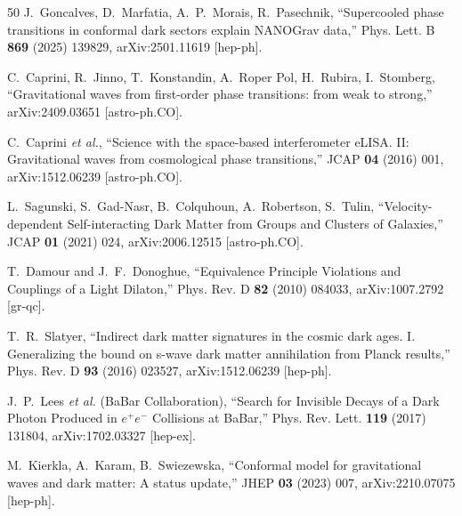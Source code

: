 \documentclass[12pt,a4paper]{article}
\begin{document}
\begin{thebibliography}{50}
J.~Goncalves, D.~Marfatia, A.~P.~Morais, R.~Pasechnik,
``Supercooled phase transitions in conformal dark sectors explain NANOGrav data,''
Phys. Lett. B \textbf{869} (2025) 139829, arXiv:2501.11619 [hep-ph].

C.~Caprini, R.~Jinno, T.~Konstandin, A.~Roper Pol, H.~Rubira, I.~Stomberg,
``Gravitational waves from first-order phase transitions: from weak to strong,''
arXiv:2409.03651 [astro-ph.CO].

C.~Caprini \textit{et al.},
``Science with the space-based interferometer eLISA. II: Gravitational waves from cosmological phase transitions,''
JCAP \textbf{04} (2016) 001, arXiv:1512.06239 [astro-ph.CO].

L.~Sagunski, S.~Gad-Nasr, B.~Colquhoun, A.~Robertson, S.~Tulin,
``Velocity-dependent Self-interacting Dark Matter from Groups and Clusters of Galaxies,''
JCAP \textbf{01} (2021) 024, arXiv:2006.12515 [astro-ph.CO].

T.~Damour and J.~F.~Donoghue,
``Equivalence Principle Violations and Couplings of a Light Dilaton,''
Phys. Rev. D \textbf{82} (2010) 084033, arXiv:1007.2792 [gr-qc].

T.~R.~Slatyer,
``Indirect dark matter signatures in the cosmic dark ages. I. Generalizing the bound on s-wave dark matter annihilation from Planck results,''
Phys. Rev. D \textbf{93} (2016) 023527, arXiv:1512.06239 [hep-ph].

J.~P.~Lees \textit{et al.} (BaBar Collaboration),
``Search for Invisible Decays of a Dark Photon Produced in $e^+e^-$ Collisions at BaBar,''
Phys. Rev. Lett. \textbf{119} (2017) 131804, arXiv:1702.03327 [hep-ex].

M.~Kierkla, A.~Karam, B.~Swiezewska,
``Conformal model for gravitational waves and dark matter: A status update,''
JHEP \textbf{03} (2023) 007, arXiv:2210.07075 [hep-ph].

\end{thebibliography}
\end{document}
